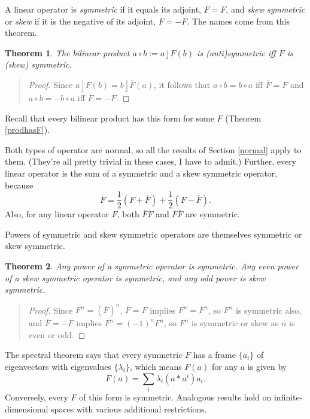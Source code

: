 \documentclass{utarticle}
\DeclareMathOperator{\lin}{\rfloor}
\newcommand{\scprod}[2]{\ensuremath{#1 * #2}}
\newcommand{\adj}[1]{\ensuremath{\overline{#1}}}
\newcommand{\half}{\ensuremath{\frac{1}{2}}}
\newtheorem{thm}{Theorem}
\newcommand{\bp}{\begin{quotation} \begin{proof}}
\newcommand{\ep}{\end{proof} \end{quotation}}
\begin{document}
A linear operator is \emph{symmetric} if it equals its adjoint, $\adj{F} = F$, and \emph{skew symmetric} 
or \emph{skew} if it is the negative of its adjoint, $\adj{F} = -F$.  The names come from this theorem.
\begin{thm}
The bilinear product $a \circ b := a \lin F(b)$ is (anti)symmetric iff $F$ is (skew) symmetric.
\label{meaningsymmskew}
\end{thm}
\bp
Since $a \lin F(b) = b \lin \adj{F}(a)$, it follows that $a \circ b = b \circ a$ iff $\adj{F} = F$ and $a \circ b = 
-b \circ a$ iff $\adj{F} = -F$. 
\ep
Recall that every bilinear product has this form for some $F$ (Theorem \ref{prodhasF}).

Both types of operator are normal, so all the results of Section \ref{normal} apply to them.  (They're all
pretty trivial in these cases, I have to admit.)  Further, every 
linear operator is the sum of a symmetric and a skew symmetric operator, because
\begin{equation} F = \half\left(F + \adj{F}\right) + \half\left(F - \adj{F}\right). \end{equation}
Also, for any linear operator $F$, both $\adj{F}F$ and $F\adj{F}$ are symmetric.

Powers of symmetric and skew symmetric operators are themselves symmetric or skew symmetric.
\begin{thm}
Any power of a symmetric operator is symmetric.  Any even power of a skew symmetric operator is
symmetric, and any odd power is skew symmetric.
\end{thm}
\bp
Since $\adj{F^n} = (\adj{F})^n$, $\adj{F} = F$ implies $\adj{F^n} = F^n$, so $F^n$ is symmetric also, 
and $\adj{F} = -F$ implies $\adj{F^n} = (-1)^n F^n$, so $F^n$ is symmetric or skew as $n$ is even or odd. 
\ep

The spectral theorem says that every symmetric $F$ has a frame $\{a_i\}$ of eigenvectors with eigenvalues 
$\{\lambda_i\}$, which means $F(a)$ for any $a$ is given by
\begin{equation} F(a) = \sum_i \lambda_i (\scprod{a}{a^i}) a_i. \label{spectralthonvec} \end{equation}
Conversely, every $F$ of this form is symmetric.  Analogous results hold on infinite-dimensional spaces 
with various additional restrictions.
\end{document}
